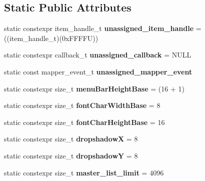 \subsection*{Static Public Attributes}
\begin{DoxyCompactItemize}
\item 
\hypertarget{classDOSBoxMenu_aac3dd5a20a2f627ef4ccb5abc4d6786a}{static constexpr item\-\_\-handle\-\_\-t {\bfseries unassigned\-\_\-item\-\_\-handle} = ((item\-\_\-handle\-\_\-t)(0x\-F\-F\-F\-F\-U))}\label{classDOSBoxMenu_aac3dd5a20a2f627ef4ccb5abc4d6786a}

\item 
\hypertarget{classDOSBoxMenu_a87b7fc497c79c99d8de533e252eb1d24}{static constexpr callback\-\_\-t {\bfseries unassigned\-\_\-callback} = N\-U\-L\-L}\label{classDOSBoxMenu_a87b7fc497c79c99d8de533e252eb1d24}

\item 
\hypertarget{classDOSBoxMenu_a7b91ea386002b586802d90d4266b13b8}{static const mapper\-\_\-event\-\_\-t {\bfseries unassigned\-\_\-mapper\-\_\-event}}\label{classDOSBoxMenu_a7b91ea386002b586802d90d4266b13b8}

\item 
\hypertarget{classDOSBoxMenu_ad32710720711c5053a663ef511699c5c}{static constexpr size\-\_\-t {\bfseries menu\-Bar\-Height\-Base} = (16 + 1)}\label{classDOSBoxMenu_ad32710720711c5053a663ef511699c5c}

\item 
\hypertarget{classDOSBoxMenu_a438ad2de6f09064c6421e8a470784352}{static constexpr size\-\_\-t {\bfseries font\-Char\-Width\-Base} = 8}\label{classDOSBoxMenu_a438ad2de6f09064c6421e8a470784352}

\item 
\hypertarget{classDOSBoxMenu_a08004092ed1ce6be4923da14016aa757}{static constexpr size\-\_\-t {\bfseries font\-Char\-Height\-Base} = 16}\label{classDOSBoxMenu_a08004092ed1ce6be4923da14016aa757}

\item 
\hypertarget{classDOSBoxMenu_aab96067d80112d0faf7cf6a9cc9b3698}{static constexpr size\-\_\-t {\bfseries dropshadow\-X} = 8}\label{classDOSBoxMenu_aab96067d80112d0faf7cf6a9cc9b3698}

\item 
\hypertarget{classDOSBoxMenu_ac1467155c3d0f87aec34717db86a2dbe}{static constexpr size\-\_\-t {\bfseries dropshadow\-Y} = 8}\label{classDOSBoxMenu_ac1467155c3d0f87aec34717db86a2dbe}

\item 
\hypertarget{classDOSBoxMenu_a52ea4cad9f74803b12e100344b5e796b}{static constexpr size\-\_\-t {\bfseries master\-\_\-list\-\_\-limit} = 4096}\label{classDOSBoxMenu_a52ea4cad9f74803b12e100344b5e796b}

\end{DoxyCompactItemize}

